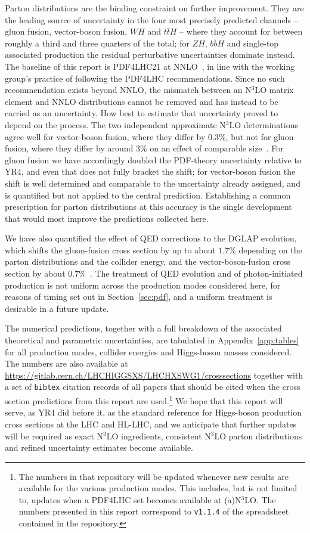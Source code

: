 Parton distributions are the binding constraint on further improvement. They
are the leading source of uncertainty in the four most precisely predicted
channels -- gluon fusion, vector-boson fusion, $WH$ and $t\bar tH$ -- where
they account for between roughly a third and three quarters of the total; for
$ZH$, $b\bar bH$ and single-top associated production the residual
perturbative uncertainties dominate instead. The baseline of this
report is PDF4LHC21 at NNLO~\cite{PDF4LHCWorkingGroup:2022cjn}, in line with
the working group's practice of following the PDF4LHC recommendations. Since no
such recommendation exists beyond NNLO, the mismatch between an N$^3$LO matrix
element and NNLO distributions cannot be removed and has instead to be carried
as an uncertainty. How best to estimate that uncertainty proved to depend on
the process. The two independent approximate N$^3$LO determinations agree well
for vector-boson fusion, where they differ by $0.3\%$, but not for gluon
fusion, where they differ by around $3\%$ on an effect of comparable
size~\cite{Cridge:2024icl}. For gluon fusion we have accordingly doubled the
PDF-theory uncertainty relative to YR4, and even that does not fully bracket
the shift; for vector-boson fusion the shift is well determined and comparable
to the uncertainty already assigned, and is quantified but not applied to the
central prediction. Establishing a common prescription for parton distributions
at this accuracy is the single development that would most improve the
predictions collected here.

We have also quantified the effect of QED corrections to the DGLAP evolution,
which shifts the gluon-fusion cross section by up to about $1.7\%$ depending on
the parton distributions and the collider energy, and the vector-boson-fusion
cross section by about $0.7\%$~\cite{Cooper-Sarkar:2025sqw}. The treatment of
QED evolution and of photon-initiated production is not uniform across the
production modes considered here, for reasons of timing set out in
Section~\ref{sec:pdf}, and a uniform treatment is desirable in a future update.

The numerical predictions, together with a full breakdown of the associated
theoretical and parametric uncertainties, are tabulated in
Appendix~\ref{app:tables} for all production modes, collider energies and
Higgs-boson masses considered. The numbers are also available at
\url{https://gitlab.cern.ch/LHCHIGGSXS/LHCHXSWG1/crosssections} together with a set of \texttt{bibtex} citation records of all papers that should be cited when the cross section predictions from this report are used.\footnote{The numbers in that repository will be updated whenever new results are available for the various production modes. This includes, but is not limited to, updates when a PDF4LHC set becomes available at (a)N$^3$LO. The numbers presented in this report correspond to \texttt{v1.1.4} of the spreadsheet contained in the repository.} We hope that
this report will serve, as YR4 did before it, as the standard reference for
Higgs-boson production cross sections at the LHC and HL-LHC, and we anticipate
that further updates will be required as exact N$^3$LO ingredients, consistent
N$^3$LO parton distributions and refined uncertainty estimates become
available.
